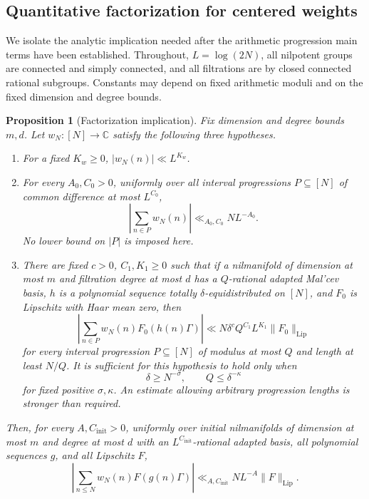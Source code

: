 \documentclass[11pt]{article}
\newtheorem{proposition}[theorem]{Proposition}
\theoremstyle{definition}
\theoremstyle{remark}
\begin{document}
\subsection{Quantitative factorization for centered weights}
\label{sec:gf-factorization}

We isolate the analytic implication needed after the arithmetic
progression main terms have been established. Throughout,
$L=\log(2N)$, all nilpotent groups are connected and simply connected,
and all filtrations are by closed connected rational subgroups. Constants
may depend on fixed arithmetic moduli and on the fixed dimension and
degree bounds.

\begin{proposition}[Factorization implication]\label{prop:gf-factorization}
Fix dimension and degree bounds $m,d$. Let $w_N:[N]\to\mathbb C$ satisfy
the following three hypotheses.
\begin{enumerate}
\item For a fixed $K_w\geq0$, $|w_N(n)|\ll L^{K_w}$.
\item For every $A_0,C_0>0$, uniformly over all interval progressions
$P\subseteq[N]$ of common difference at most $L^{C_0}$,
\begin{equation}\label{eq:gf-sw}
 \left|\sum_{n\in P}w_N(n)\right|
       \ll_{A_0,C_0}N L^{-A_0}.
\end{equation}
No lower bound on $|P|$ is imposed here.
\item There are fixed $c>0$, $C_1,K_1\geq0$ such that if a nilmanifold
of dimension at most $m$ and filtration degree at most $d$ has a
$Q$-rational adapted Mal'cev basis, $h$ is a polynomial sequence totally
$\delta$-equidistributed on $[N]$, and $F_0$ is Lipschitz with Haar mean
zero, then
\begin{equation}\label{eq:gf-ma}
 \left|\sum_{n\in P}w_N(n)F_0(h(n)\Gamma)\right|
 \ll N\delta^c Q^{C_1}L^{K_1}\|F_0\|_{\mathrm{Lip}}
\end{equation}
for every interval progression $P\subseteq[N]$ of modulus at most $Q$
and length at least $N/Q$. It is sufficient for this hypothesis to hold
only when
\begin{equation}\label{eq:gf-ma-regime}
 \delta\geq N^{-\sigma},\qquad Q\leq\delta^{-\kappa}
\end{equation}
for fixed positive $\sigma,\kappa$. An estimate allowing arbitrary
progression lengths is stronger than required.
\end{enumerate}
Then, for every $A,C_{\mathrm{init}}>0$, uniformly over initial
nilmanifolds of dimension at most $m$ and degree at most $d$ with an
$L^{C_{\mathrm{init}}}$-rational adapted basis, all polynomial sequences
$g$, and all Lipschitz $F$,
\begin{equation}\label{eq:gf-conclusion}
 \left|\sum_{n\leq N}w_N(n)F(g(n)\Gamma)\right|
     \ll_{A,C_{\mathrm{init}}}N L^{-A}\|F\|_{\mathrm{Lip}}.
\end{equation}
\end{proposition}
\end{document}
